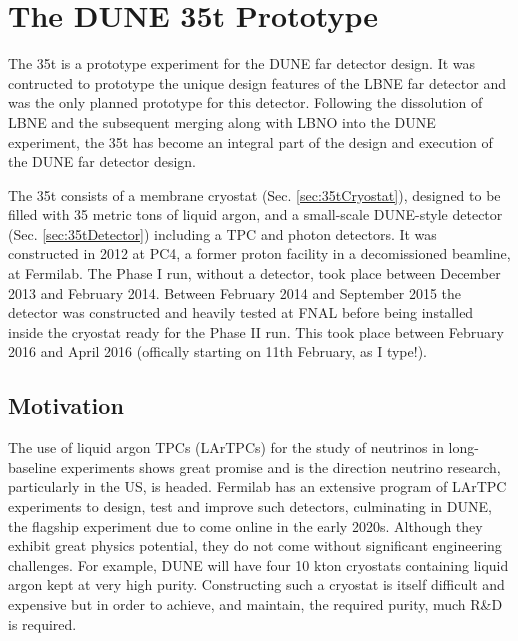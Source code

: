 
\chapter{The DUNE 35t Prototype}\label{sec:35t}

The 35t is a prototype experiment for the DUNE far detector design.  It was contructed to prototype the unique design features of the LBNE far detector and was the only planned prototype for this detector.  Following the dissolution of LBNE and the subsequent merging along with LBNO into the DUNE experiment, the 35t has become an integral part of the design and execution of the DUNE far detector design.

The 35t consists of a membrane cryostat (Sec. \ref{sec:35tCryostat}), designed to be filled with 35 metric tons of liquid argon, and a small-scale DUNE-style detector (Sec. \ref{sec:35tDetector}) including a TPC and photon detectors.  It was constructed in 2012 at PC4, a former proton facility in a decomissioned beamline, at Fermilab.  The Phase I run, without a detector, took place between December 2013 and February 2014.  Between February 2014 and September 2015 the detector was constructed and heavily tested at FNAL before being installed inside the cryostat ready for the Phase II run.  This took place between February 2016 and April 2016 (offically starting on 11th February, as I type!).

\section{Motivation}\label{sec:35tMotivation}

The use of liquid argon TPCs (LArTPCs) for the study of neutrinos in long-baseline experiments shows great promise and is the direction neutrino research, particularly in the US, is headed.  Fermilab has an extensive program of LArTPC experiments to design, test and improve such detectors, culminating in DUNE, the flagship experiment due to come online in the early 2020s.  Although they exhibit great physics potential, they do not come without significant engineering challenges.  For example, DUNE will have four 10 kton cryostats containing liquid argon kept at very high purity.  Constructing such a cryostat is itself difficult and expensive but in order to achieve, and maintain, the required purity, much R\&D is required.

